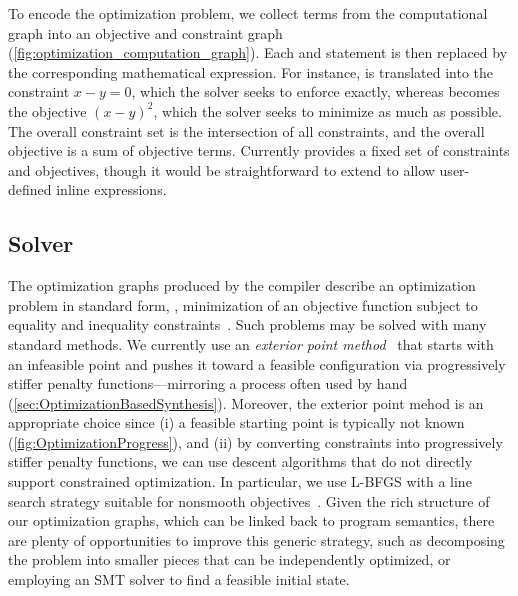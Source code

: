  
 To encode the optimization problem, we collect terms from the computational graph into an objective and constraint graph (\cref{fig:optimization_computation_graph}). Each  and  statement is then replaced by the corresponding mathematical expression.  For instance,  is translated into the constraint \(x-y=0\), which the solver seeks to enforce exactly, whereas  becomes the objective \((x-y)^2\), which the solver seeks to minimize as much as possible.  The overall constraint set is the intersection of all constraints, and the overall objective is a sum of objective terms. Currently \Penrose{} provides a fixed set of constraints and objectives, though it would be straightforward to extend \Style{} to allow user-defined inline expressions.


\subsection{Solver}
\label{sec:Solver}

The optimization graphs produced by the compiler describe an optimization problem in standard form, \ie, minimization of an objective function subject to equality and inequality constraints~\cite[Section 4.1]{convexOptimization}.  Such problems may be solved with many standard methods. We currently use an \emph{exterior point method}~\cite{hiroshi_primal-dual_2010} that starts with an infeasible point and pushes it toward a feasible configuration via progressively stiffer penalty functions---mirroring a process often used by hand (\cref{sec:OptimizationBasedSynthesis}).  Moreover, the exterior point mehod is an appropriate choice since (i) a feasible starting point is typically not known (\cref{fig:OptimizationProgress}), and (ii) by converting constraints into progressively stiffer penalty functions, we can use descent algorithms that do not directly support constrained optimization.  In particular, we use L-BFGS with a line search strategy suitable for nonsmooth objectives~\cite{Lewis:2009:NOB}.  Given the rich structure of our optimization graphs, which can be linked back to program semantics, there are plenty of opportunities to improve this generic strategy, such as decomposing the problem into smaller pieces that can be independently optimized, or employing an SMT solver to find a feasible initial state.

